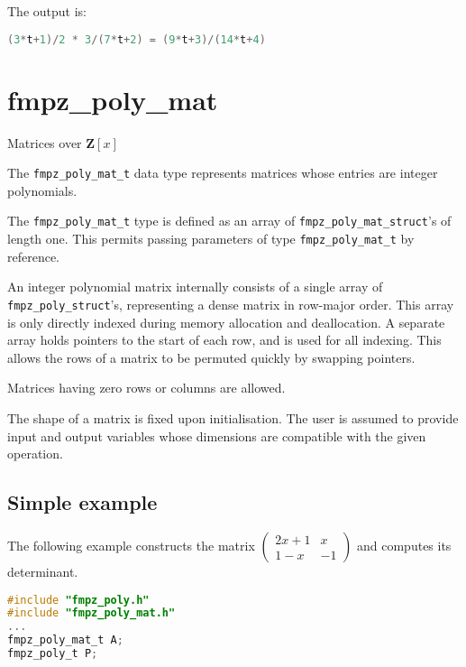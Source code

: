 \documentclass[a4paper,10pt]{book}
\newcommand{\code}{\lstinline}
\begin{document}
{{The output is:
\begin{lstlisting}[language=c]
(3*t+1)/2 * 3/(7*t+2) = (9*t+3)/(14*t+4)
\end{lstlisting}




\chapter{fmpz\_poly\_mat}
\epigraph{Matrices over $\mathbf{Z}[x]$}{}

The \code{fmpz_poly_mat_t} data type represents matrices whose
entries are integer polynomials.

The \code{fmpz_poly_mat_t} type is defined as an array of
\code{fmpz_poly_mat_struct}'s of length one.
This  permits passing parameters of type \code{fmpz_poly_mat_t}
by reference.

An integer polynomial matrix internally consists of a single array
of \code{fmpz_poly_struct}'s, representing a dense matrix in
row-major order. This array is only directly indexed
during memory allocation and deallocation. A separate array
holds pointers to the start of each row, and is used for all
indexing. This allows the rows of a matrix to be permuted
quickly by swapping pointers.

Matrices having zero rows or columns are allowed.

The shape of a matrix is fixed upon initialisation.
The user is assumed to provide input and output variables
whose dimensions are compatible with the given operation.

\section{Simple example}

The following example constructs the matrix
$\begin{pmatrix} 2x+1 & x \\ 1-x & -1 \end{pmatrix}$ and computes
its determinant.

\begin{lstlisting}[language=c]
#include "fmpz_poly.h"
#include "fmpz_poly_mat.h"
...
fmpz_poly_mat_t A;
fmpz_poly_t P;


\end{lstlisting}}}
\end{document}
